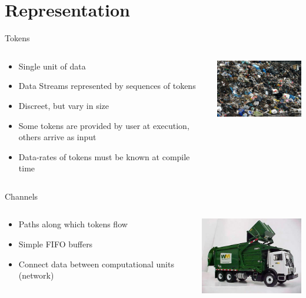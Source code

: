 \documentclass{beamer}
\begin{document}
\section{Representation}

\begin{frame}{Tokens}
\begin{columns}
\begin{column}{5cm}
\begin{itemize}
	\item Single unit of data
	\item Data Streams represented by sequences of tokens
	\item Discreet, but vary in size
	\item Some tokens are provided by user at execution, others arrive as input
	\item Data-rates of tokens must be known at compile time
\end{itemize}
\end{column}
\begin{column}{5cm}
\includegraphics[width=5cm]{../res/pile-of-garbage.jpg}
\end{column}
\end{columns}
\end{frame}

\begin{frame}{Channels}
\begin{columns}
\begin{column}{5cm}
\begin{itemize}
	\item Paths along which tokens flow
	\item Simple FIFO buffers
	\item Connect data between computational units (network)
\end{itemize}
\end{column}
\begin{column}{5cm}
\includegraphics[width=5cm]{../res/waste-management-truck.jpg}
\end{column}
\end{columns}
\end{frame}
\end{document}
